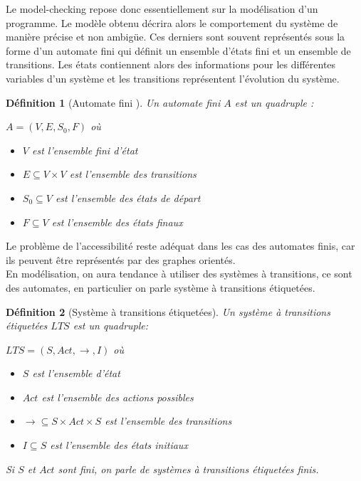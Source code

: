 \documentclass[a4paper]{report}
\theoremstyle{break}
\newtheorem{defin}{Définition}
\theoremstyle{breakplain}
\begin{document}
Le model-checking repose donc essentiellement sur la modélisation d'un programme. Le modèle obtenu décrira alors le comportement du système de manière précise et non ambigüe. Ces derniers sont souvent représentés sous la forme d'un automate fini qui définit un ensemble d'états fini et un ensemble de transitions. Les états contiennent alors des informations pour les différentes variables d'un système et les transitions représentent l'évolution du système.
\begin{defin}[Automate fini \cite{geeraerts2013multiprocessor}]
Un automate fini $A$ est un quadruple :
\begin{center}
$A=(V,E,S_0,F)$ où
\end{center}
\begin{itemize}
\item $V$ est l'ensemble fini d'état
\item $E \subseteq V \times V$ est l'ensemble des transitions
\item $S_0 \subseteq V$ est l'ensemble des états de départ
\item $F \subseteq V$ est l'ensemble des états finaux
\end{itemize}
\end{defin}

Le problème de l'accessibilité reste adéquat dans les cas des automates finis, car ils peuvent être représentés par des graphes orientés.\\

En modélisation, on aura tendance à utiliser des systèmes à transitions, ce sont des automates, en particulier on parle système à transitions étiquetées.

\begin{defin}[Système à transitions étiquetées]
Un système à transitions étiquetées $LTS$ est un quadruple:
\begin{center}
$LTS = (S, Act, \rightarrow, I)$ où
\end{center}
\begin{itemize}
\item $S$ est l'ensemble d'état
\item $Act$ est l'ensemble des actions possibles
\item $\rightarrow \subseteq S \times Act \times S$ est l'ensemble des transitions
\item $I \subseteq S$ est l'ensemble des états initiaux
\end{itemize}
Si $S$ et $Act$ sont fini, on parle de systèmes à transitions étiquetées finis.
\end{defin}
\end{document}
